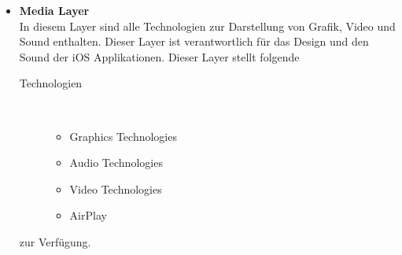 \begin{description}
\begin{itemize}
\begin{description}
\begin{multicols}{2}
\begin{itemize}
				\item JavaScript Framework
				\item Mobile Core Services Framework
				\item Multipeer Connectivity Framework
				\item NewStandKit Framework
				\item PassKit Framework
				\item Quick Look Framework
				\item Safari Services Framework
				\item Social Framework
				\item StoreKit Framework
				\item System Configuration Framework
				\item WebKit Framework
			\end{itemize}
			\end{multicols}
		\end{description}

         	\item \textbf{Media Layer} \\
		In diesem Layer sind alle Technologien zur Darstellung von Grafik, Video und Sound enthalten. Dieser Layer ist verantwortlich für das Design und den Sound der iOS Applikationen.  
		Dieser Layer stellt folgende
		\begin{description}
			\item[\glqq Technologien\grqq{}]~\par
			\begin{itemize}
				\item Graphics Technologies
				\item Audio Technologies
				\item Video Technologies
				\item AirPlay
			\end{itemize}
		\end{description}
		zur Verfügung.
		

\end{itemize}
\end{description}
